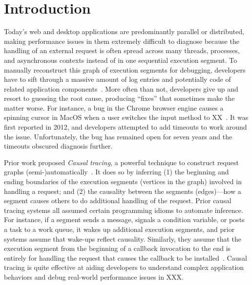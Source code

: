 \section{Introduction} \label{sec:intro}
%

%

Today's web and desktop applications are predominantly parallel or
distributed, making performance issues in them extremely difficult to
diagnose because the handling of an external request is often spread
across many threads, processes, and asynchronous
contexts
instead of in one
sequential execution segment.  To manually reconstruct this graph of
execution segments for debugging, developers have to sift through a
massive amount of log entries and potentially code of related application
components~\cite{luXXXXX}.  More often than not, developers give up and resort to
guessing the root cause, producing ``fixes'' that sometimes make the matter
worse.  For instance, a bug in the Chrome browser engine causes a spinning cursor
in MacOS when a user switches the input method to XX~\cite{bug-url}.  It
was first reported in 2012, and developers attempted to add timeouts
to work around the issue.  Unfortunately, the bug has remained 
open for seven years and the timeouts obscured diagnosis further.

Prior work proposed \emph{Causal tracing}, a powerful technique to
construct request graphs (semi-)automatically~\cite{xxx}. It does so by
inferring (1) the beginning and ending boundaries of the execution
segments (vertices in the graph) involved in handling a request; and (2)
the causality between the segments (edges)---how a segment causes others
to do additional handling of the request.  Prior causal tracing systems
all assumed certain programming idioms to automate inference.  For
instance, if a segment sends a message, signals a condition variable, or
posts a task to a work queue, it wakes up additional execution segments,
and prior systems assume that wake-ups reflect causality.  Similarly, they
assume that the execution segment from the beginning of a callback
invocation to the end is entirely for handling the request that causes the
callback to be installed~\cite{}.  Causal tracing is quite effective at
aiding developers to understand complex application behaviors and debug
real-world performance issues in XXX.

